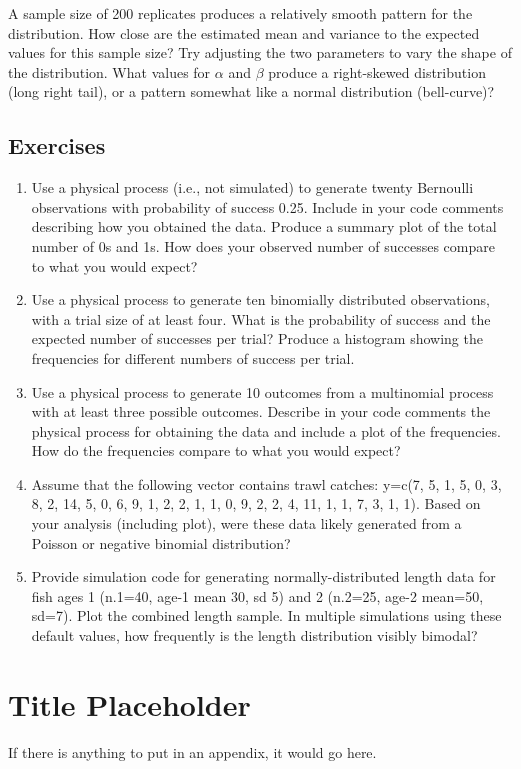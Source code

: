 \documentclass[
]{krantz}
\begin{document}
A sample size of 200 replicates produces a relatively smooth pattern for the distribution. How close are the estimated mean and variance to the expected values for this sample size? Try adjusting the two parameters to vary the shape of the distribution. What values for \(\alpha\) and \(\beta\) produce a right-skewed distribution (long right tail), or a pattern somewhat like a normal distribution (bell-curve)?

\hypertarget{exercises}{%
\section{Exercises}\label{exercises}}

\begin{enumerate}
\def\labelenumi{\arabic{enumi}.}
\item
  Use a physical process (i.e., not simulated) to generate twenty Bernoulli observations with probability of success 0.25. Include in your code comments describing how you obtained the data. Produce a summary plot of the total number of 0s and 1s. How does your observed number of successes compare to what you would expect?
\item
  Use a physical process to generate ten binomially distributed observations, with a trial size of at least four. What is the probability of success and the expected number of successes per trial? Produce a histogram showing the frequencies for different numbers of success per trial.
\item
  Use a physical process to generate 10 outcomes from a multinomial process with at least three possible outcomes. Describe in your code comments the physical process for obtaining the data and include a plot of the frequencies. How do the frequencies compare to what you would expect?
\item
  Assume that the following vector contains trawl catches: y=c(7, 5, 1, 5, 0, 3, 8, 2, 14, 5, 0, 6, 9, 1, 2, 2, 1, 1, 0, 9, 2, 2, 4, 11, 1, 1, 7, 3, 1, 1). Based on your analysis (including plot), were these data likely generated from a Poisson or negative binomial distribution?
\item
  Provide simulation code for generating normally-distributed length data for fish ages 1 (n.1=40, age-1 mean 30, sd 5) and 2 (n.2=25, age-2 mean=50, sd=7). Plot the combined length sample. In multiple simulations using these default values, how frequently is the length distribution visibly bimodal?
\end{enumerate}

\cleardoublepage

\hypertarget{appendix-appendix}{%
\appendix {}}


\hypertarget{title-placeholder}{%
\chapter{Title Placeholder}\label{title-placeholder}}

If there is anything to put in an appendix, it would go here.

  

\backmatter
\printindex
\end{document}
